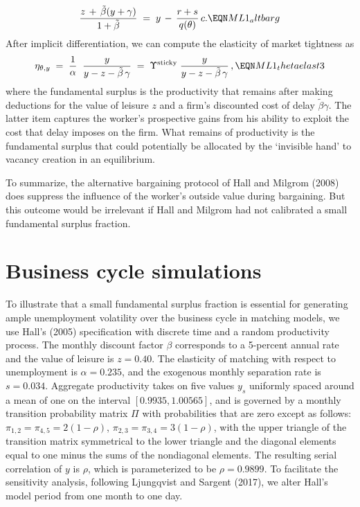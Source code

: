 $$
{ z\,+\,\tilde \beta(y+\gamma) \over 1+\tilde \beta }  \;=\;
y \,-\, {r + s \over q(\theta)} \, c .       \EQN ML1_altbarg
$$
After implicit differentiation,
we can compute the elasticity of market tightness as
$$
\eta_{\theta,y}
\;=\; {1 \over \alpha} \; \;
      {y \over y-z- \tilde \beta \,\gamma}
\;=\; \Upsilon^{\rm sticky}\;
         {y \over y-z- \tilde \beta \,\gamma}\,,  \EQN ML1_thetaelast3
$$
where the fundamental surplus is the productivity
that remains after making deductions for the value of leisure $z$
and a firm's discounted cost of delay $\tilde \beta \gamma$.
The latter item
captures the worker's prospective gains from his
 ability to exploit the
cost that delay imposes on the firm.  What remains of productivity is the
fundamental surplus that could potentially be allocated by the
`invisible hand'  to  vacancy creation in an equilibrium.

To summarize, the alternative bargaining
protocol of Hall and Milgrom (2008) does suppress the influence of the
worker's outside value during bargaining. But
this outcome would be irrelevant if  Hall and Milgrom had  not
calibrated a small fundamental surplus fraction.







\section{Business cycle simulations}\label{sec:FS_simulations}%
To illustrate that a small fundamental surplus fraction is essential for
generating ample unemployment volatility over the business cycle in
matching models, we use  Hall's (2005) specification
with discrete time and a  random productivity process.
The monthly discount factor $\beta$ corresponds to a 5-percent annual
rate and the value of leisure is $z=0.40$. The elasticity of
matching with respect to unemployment is $\alpha=0.235$, and the
exogenous monthly separation rate is $s=0.034$. Aggregate productivity
takes on five  values $y_s$ uniformly spaced around a mean of
one on the interval $[0.9935, 1.00565]$, and is governed by
a monthly transition probability matrix $\Pi$ with probabilities
that are zero except as follows: $\pi_{1,2}=\pi_{4,5}=2(1-\rho)$,
$\pi_{2,3}=\pi_{3,4}=3(1-\rho)$, with the upper triangle of the
transition matrix symmetrical to the lower triangle and the
diagonal elements equal to one minus the sums of the nondiagonal
elements. The resulting serial correlation of $y$ is $\rho$, which
is parameterized to be $\rho=0.9899$.
To facilitate the
sensitivity analysis, following Ljungqvist and Sargent (2017), we alter
Hall's model period from one month to one day.




